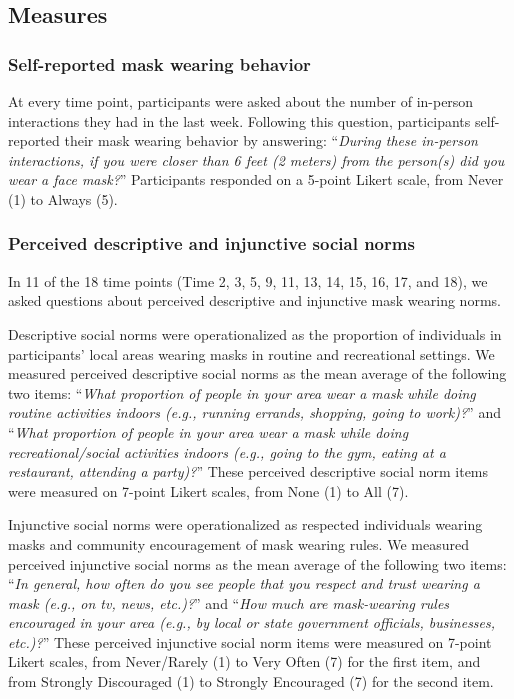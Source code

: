 \documentclass[
  man,floatsintext]{apa6}
\begin{document}
\hypertarget{measures}{%
\subsection{Measures}\label{measures}}

\hypertarget{self-reported-mask-wearing-behavior}{%
\subsubsection{Self-reported mask wearing behavior}\label{self-reported-mask-wearing-behavior}}

At every time point, participants were asked about the number of in-person interactions they had in the last week. Following this question, participants self-reported their mask wearing behavior by answering: ``\emph{During these in-person interactions, if you were closer than 6 feet (2 meters) from the person(s) did you wear a face mask?}'' Participants responded on a 5-point Likert scale, from Never (1) to Always (5).

\hypertarget{perceived-descriptive-and-injunctive-social-norms}{%
\subsubsection{Perceived descriptive and injunctive social norms}\label{perceived-descriptive-and-injunctive-social-norms}}

In 11 of the 18 time points (Time 2, 3, 5, 9, 11, 13, 14, 15, 16, 17, and 18), we asked questions about perceived descriptive and injunctive mask wearing norms.

Descriptive social norms were operationalized as the proportion of individuals in participants' local areas wearing masks in routine and recreational settings. We measured perceived descriptive social norms as the mean average of the following two items: ``\emph{What proportion of people in your area wear a mask while doing routine activities indoors (e.g., running errands, shopping, going to work)?}'' and ``\emph{What proportion of people in your area wear a mask while doing recreational/social activities indoors (e.g., going to the gym, eating at a restaurant, attending a party)?}'' These perceived descriptive social norm items were measured on 7-point Likert scales, from None (1) to All (7).

Injunctive social norms were operationalized as respected individuals wearing masks and community encouragement of mask wearing rules. We measured perceived injunctive social norms as the mean average of the following two items: ``\emph{In general, how often do you see people that you respect and trust wearing a mask (e.g., on tv, news, etc.)?}'' and ``\emph{How much are mask-wearing rules encouraged in your area (e.g., by local or state government officials, businesses, etc.)?}'' These perceived injunctive social norm items were measured on 7-point Likert scales, from Never/Rarely (1) to Very Often (7) for the first item, and from Strongly Discouraged (1) to Strongly Encouraged (7) for the second item.
\end{document}
